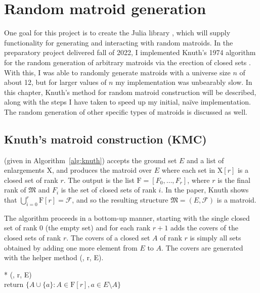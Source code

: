 \chapter{Random matroid generation}

One goal for this project is to create the Julia library , which will supply functionality for generating and interacting with random matroids. In the preparatory project delivered fall of 2022, I implemented Knuth's 1974 algorithm for the random generation of arbitrary matroids via the erection of closed sets \cite{knuth-1975}. With this, I was able to randomly generate matroids with a universe size $n$ of about 12, but for larger values of $n$ my implementation was unbearably slow. In this chapter, Knuth's method for random matroid construction will be described, along with the steps I have taken to speed up my initial, naïve implementation. The random generation of other specific types of matroids is discussed as well.

\section{Knuth's matroid construction (KMC)}
 (given in Algorithm~\ref{alg:knuth}) accepts the ground set $E$ and a list of enlargements $\mathrm{X}$, and produces the matroid over $E$ where each set in $\mathrm{X}[r]$ is a closed set of rank $r$. The output is the list $\mathrm{F} = [F_0, \ldots, F_r]$, where $r$ is the final rank of $\mathfrak{M}$ and $F_i$ is the set of closed sets of rank $i$. In the paper, Knuth shows that $\bigcup_{i=0}^r \mathrm{F}[r] = \mathcal{F}$, and so the resulting structure $\mathfrak{M} = (E, \mathcal{F})$ is a matroid.

The algorithm proceeds in a bottom-up manner, starting with the single closed set of rank 0 (the empty set) and for each rank $r+1$ adds the covers of the closed sets of rank $r$. The covers of a closed set $A$ of rank $r$ is simply all sets obtained by adding one more element from $E$ to $A$. The covers are generated with the helper method (, r, E).

\begin{tcolorbox}[pseudo/filled, colback=lighttan]
  \begin{pseudo}*
    (, r, E) \\
    return $\{ A \cup \{a\} : A \in \mathrm{F}[r], a \in E \setminus A \}$
  \end{pseudo}
\end{tcolorbox}

